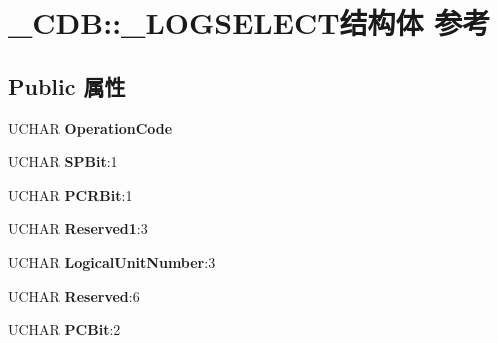 \hypertarget{struct___c_d_b_1_1___l_o_g_s_e_l_e_c_t}{}\section{\+\_\+\+C\+DB\+:\+:\+\_\+\+L\+O\+G\+S\+E\+L\+E\+C\+T结构体 参考}
\label{struct___c_d_b_1_1___l_o_g_s_e_l_e_c_t}
\subsection*{Public 属性}
\begin{DoxyCompactItemize}
\item 
\mbox{\label{struct___c_d_b_1_1___l_o_g_s_e_l_e_c_t_a4c2c3183a645d8c8a3a20c03200d65a0}} 
U\+C\+H\+AR {\bfseries Operation\+Code}
\item 
\mbox{\label{struct___c_d_b_1_1___l_o_g_s_e_l_e_c_t_ad5fce3de19b3d9d8997c1ad0c755853c}} 
U\+C\+H\+AR {\bfseries S\+P\+Bit}\+:1
\item 
\mbox{\label{struct___c_d_b_1_1___l_o_g_s_e_l_e_c_t_ab4aec9246db84a640121ef49934b9f72}} 
U\+C\+H\+AR {\bfseries P\+C\+R\+Bit}\+:1
\item 
\mbox{\label{struct___c_d_b_1_1___l_o_g_s_e_l_e_c_t_a3d35216c7b3a10f7787536748a8f61d3}} 
U\+C\+H\+AR {\bfseries Reserved1}\+:3
\item 
\mbox{\label{struct___c_d_b_1_1___l_o_g_s_e_l_e_c_t_a1bfb8b25b3a632ea95d6fcdaecbb5ab2}} 
U\+C\+H\+AR {\bfseries Logical\+Unit\+Number}\+:3
\item 
\mbox{\label{struct___c_d_b_1_1___l_o_g_s_e_l_e_c_t_a31ad09aa2c222a566d6bc56f7b33a195}} 
U\+C\+H\+AR {\bfseries Reserved}\+:6
\item 
\mbox{\label{struct___c_d_b_1_1___l_o_g_s_e_l_e_c_t_affd98c4c6edacc9c4c1d4d6b2b10f540}} 
U\+C\+H\+AR {\bfseries P\+C\+Bit}\+:2
\item 
\mbox{\label{struct___c_d_b_1_1___l_o_g_s_e_l_e_c_t_a6479a8edbe187d244d46baa27680478a}} 

\end{DoxyCompactItemize}
